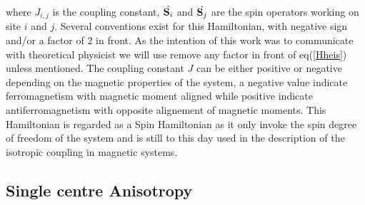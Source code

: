 \documentclass{article}
\begin{document}
where $J_{i,j}$ is the coupling constant, $\hat{\vb S_i}$ and $\hat{\vb S_j}$ are the spin operators working on site $i$ and $j$.
Several conventions exist for this Hamiltonian, with negative sign and/or a factor of 2 in front. 
As the intention of this work was to communicate with theoretical physicist we will use remove any factor in front of eq(\ref{Hheis}) unless mentioned. 
The coupling constant $J$ can be either positive or negative depending on the magnetic properties of the system, a negative value indicate ferromagnetism with magnetic moment aligned while positive indicate antiferromagnetism with opposite alignement of magnetic moments.
This Hamiltonian is regarded as a Spin Hamiltonian as it only invoke the spin degree of freedom of the system and is still to this day used in the description of the isotropic coupling in magnetic systems.

\subsection{Single centre Anisotropy}
\end{document}
